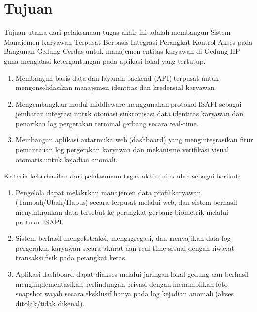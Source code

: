 \section{Tujuan}
Tujuan utama dari pelaksanaan tugas akhir ini adalah membangun Sistem Manajemen Karyawan Terpusat Berbasis Integrasi Perangkat Kontrol Akses pada Bangunan Gedung Cerdas untuk manajemen entitas karyawan di Gedung IIP guna mengatasi ketergantungan pada aplikasi lokal yang tertutup.
\begin{enumerate}
    \item Membangun basis data dan layanan backend (API) terpusat untuk mengonsolidasikan manajemen identitas dan kredensial karyawan.
    \item Mengembangkan modul middleware menggunakan protokol ISAPI sebagai jembatan integrasi untuk otomasi sinkronisasi data identitas karyawan dan penarikan log pergerakan terminal gerbang secara real-time.
    \item Membangun aplikasi antarmuka web (dashboard) yang mengintegrasikan fitur pemantauan log pergerakan karyawan dan mekanisme verifikasi visual otomatis untuk kejadian anomali.
\end{enumerate}
Kriteria keberhasilan dari pelaksanaan tugas akhir ini adalah sebagai berikut:
\begin{enumerate}
    \item Pengelola dapat melakukan manajemen data profil karyawan (Tambah/Ubah/Hapus) secara terpusat melalui web, dan sistem berhasil menyinkronkan data tersebut ke perangkat gerbang biometrik melalui protokol ISAPI.
    \item Sistem berhasil mengekstraksi, mengagregasi, dan menyajikan data log pergerakan karyawan secara akurat dan real-time sesuai dengan riwayat transaksi fisik pada perangkat keras.
    \item Aplikasi dashboard dapat diakses melalui jaringan lokal gedung dan berhasil mengimplementasikan perlindungan privasi dengan menampilkan foto snapshot wajah secara eksklusif hanya pada log kejadian anomali (akses ditolak/tidak dikenal).
\end{enumerate}

